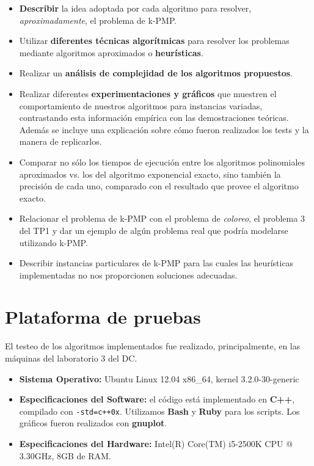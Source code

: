 \documentclass[a4paper]{article}
\begin{document}
\begin{itemize}
  \item \textbf{Describir} la idea adoptada por cada algoritmo para resolver, \textit{aproximadamente}, el problema de k-PMP.

  \item Utilizar \textbf{diferentes técnicas algorítmicas} para resolver los problemas mediante algoritmos aproximados o \textbf{heurísticas}.

  \item Realizar un \textbf{análisis de complejidad de los algoritmos propuestos}.

  \item Realizar diferentes \textbf{experimentaciones y gráficos} que muestren el comportamiento de nuestros algoritmos para instancias variadas, contrastando esta información empírica con las demostraciones teóricas.
  Además se incluye una explicación sobre cómo fueron realizados los tests y la manera de replicarlos.

  \item Comparar no sólo los tiempos de ejecución entre los algoritmos polinomiales aproximados vs. los del algoritmo exponencial exacto, sino también la precisión de cada uno, comparado con el resultado que provee el algoritmo exacto.

  \item Relacionar el problema de k-PMP con el problema de \textit{coloreo}, el problema 3 del TP1 y dar un ejemplo de algún problema real que podría modelarse utilizando k-PMP.

  \item Describir instancias particulares de k-PMP para las cuales las heurísticas implementadas no nos proporcionen soluciones adecuadas.
\end{itemize}



\newpage
\section{Plataforma de pruebas}
El testeo de los algoritmos implementados fue realizado, principalmente, en las máquinas del laboratorio 3 del DC. \newline
\begin{itemize}
  \item \textbf{Sistema Operativo:} Ubuntu Linux 12.04 x86_64, kernel 3.2.0-30-generic

  \item \textbf{Especificaciones del Software:} el código está implementado en \textbf{C++}, compilado con \verb|-std=c++0x|.
  Utilizamos \textbf{Bash} y \textbf{Ruby} para los scripts. Los gráficos fueron realizados con \textbf{gnuplot}.

  \item \textbf{Especificaciones del Hardware:} Intel(R) Core(TM) i5-2500K CPU @ 3.30GHz, 8GB de RAM.
\end{itemize}
\end{document}
